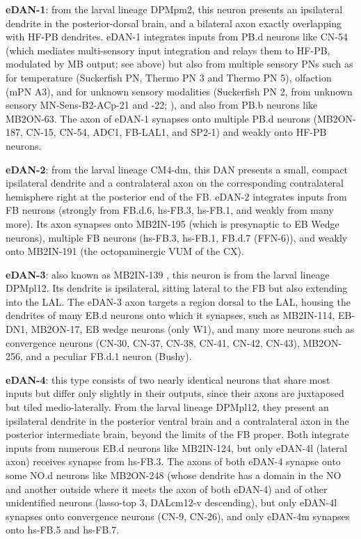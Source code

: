 \textbf{eDAN-1}: from the larval lineage DPMpm2, this neuron presents an ipsilateral dendrite in the posterior-dorsal brain, and a bilateral axon exactly overlapping with HF-PB dendrites. eDAN-1 integrates inputs from PB.d neurons like CN-54 (which mediates multi-sensory input integration and relays them to HF-PB, modulated by MB output; see above) but also from multiple sensory PNs such as for temperature (Suckerfish PN, Thermo PN 3 and Thermo PN 5), olfaction (mPN A3), and for unknown sensory modalities (Suckerfish PN 2, from unknown sensory MN-Sens-B2-ACp-21 and -22; \citep{miroschnikow2018convergence}), and also from PB.b neurons like MB2ON-63. The axon of eDAN-1 synapses onto multiple PB.d neurons (MB2ON-187, CN-15, CN-54, ADC1, FB-LAL1, and SP2-1) and weakly onto HF-PB neurons.

\textbf{eDAN-2}: from the larval lineage CM4-dm, this DAN presents a small, compact ipsilateral dendrite and a contralateral axon on the corresponding contralateral hemisphere right at the posterior end of the FB. eDAN-2 integrates inputs from FB neurons (strongly from FB.d.6, hs-FB.3, hs-FB.1, and weakly from many more). Its axon synapses onto MB2IN-195 (which is presynaptic to EB Wedge neurons), multiple FB neurons (hs-FB.3, hs-FB.1, FB.d.7 (FFN-6)), and weakly onto MB2IN-191 (the octopaminergic VUM of the CX).

\textbf{eDAN-3}: also known as MB2IN-139 \citep{eschbach2021circuits}, this neuron is from the larval lineage DPMpl12. Its dendrite is ipsilateral, sitting lateral to the FB but also extending into the LAL. The eDAN-3 axon targets a region dorsal to the LAL, housing the dendrites of  many EB.d neurons onto which it synapses, such as MB2IN-114, EB-DN1, MB2ON-17, EB wedge neurons (only W1), and many more neurons such as convergence neurons (CN-30, CN-37, CN-38, CN-41, CN-42, CN-43), MB2ON-256, and a peculiar FB.d.1 neuron (Bushy).

\textbf{eDAN-4}: this type consists of two nearly identical neurons that share most inputs but differ only slightly in their outputs, since their axons are juxtaposed but tiled medio-laterally. From the larval lineage DPMpl12, they present an ipsilateral dendrite in the posterior ventral brain and a contralateral axon in the posterior intermediate brain, beyond the limits of the FB proper. Both integrate inputs from numerous EB.d neurons like MB2IN-124, but only eDAN-4l (lateral axon) receives synapse from hs-FB.3. The axons of both eDAN-4 synapse onto some NO.d neurons like MB2ON-248 (whose dendrite has a domain in the NO and another outside where it meets the axon of both eDAN-4) and of other unidentified neurons (lasso-top 3, DALcm12-v descending), but only eDAN-4l synapses onto convergence neurons (CN-9, CN-26), and only eDAN-4m synapses onto hs-FB.5 and hs-FB.7.

